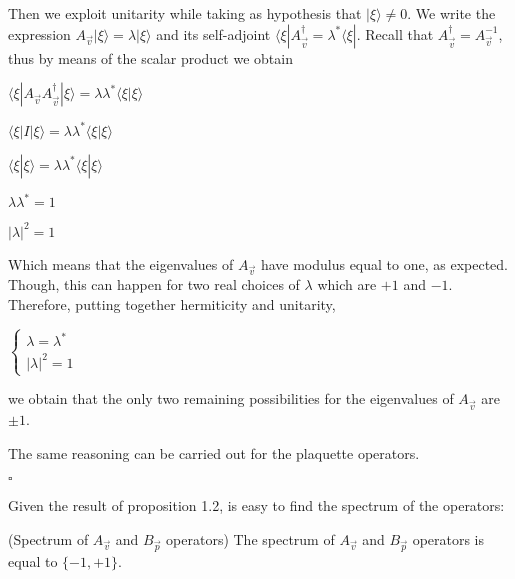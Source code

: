 \documentclass{Configuration_Files/PoliMi3i_thesis}
\begin{document}

Then we exploit unitarity while taking as hypothesis that $|\xi \rangle \neq 0$. 
We write the expression $A_{\vec{v}} |\xi \rangle = \lambda |\xi \rangle$ and its self-adjoint $\langle \xi| A_{\vec{v}}^{\dagger} = \lambda^* \langle \xi|$. Recall that $A_{\vec{v}}^{\dagger}=A_{\vec{v}}^{-1}$, thus by means of the scalar product we obtain 

\begin{center}
	$\langle \xi|A_{\vec{v}} A_{\vec{v}}^{\dagger}|\xi\rangle = \lambda \lambda^* \langle \xi |\xi \rangle$
	
	$\langle \xi|I|\xi \rangle = \lambda \lambda^* \langle \xi |\xi \rangle$
	
	$\langle \xi|\xi \rangle = \lambda \lambda^* \langle \xi |\xi \rangle $
	
	$ \lambda \lambda^* = 1 $
	
	$ |\lambda|^2 = 1 $
\end{center}

Which means that the eigenvalues of $A_{\vec{v}}$ have modulus equal to one, as expected. Though, this can happen for two real choices of $\lambda$ which are $+1$ and $-1$.
Therefore, putting together hermiticity and unitarity, 

\begin{center}
$\begin{cases}
	 \lambda = \lambda^* \\
	 |\lambda|^2 = 1 
\end{cases}$
\end{center}

we obtain that the only two remaining possibilities for the eigenvalues of $A_{\vec{v}}$ are $\pm 1$. \newline

The same reasoning can be carried out for the plaquette operators.

\hfill $\square$ 

Given the result of proposition 1.2, is easy to find the spectrum of the operators: 

\begin{proposition} (Spectrum of $A_{\vec{v}}$ and $B_{\vec{p}}$ operators) The spectrum of $A_{\vec{v}}$ and $B_{\vec{p}}$ operators is equal to $\{-1,+1\}$. 
\end{proposition}
\end{document}
